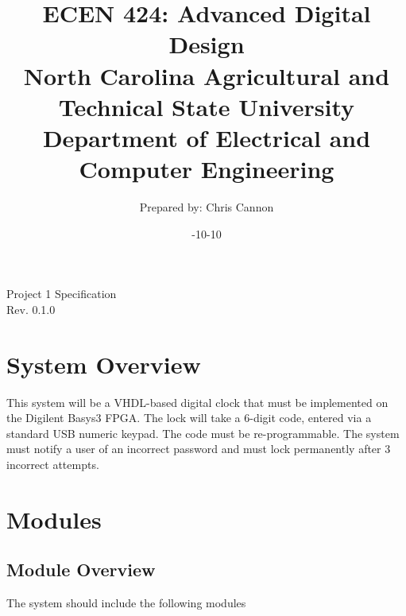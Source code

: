 \documentclass[11pt]{article}
\title {{\titleFont ECEN 424: Advanced Digital Design\\ North Carolina Agricultural and Technical State University \\ Department of Electrical and Computer Engineering}} %
\author{\titleFont Prepared by: Chris Cannon} %
\date{\titleFont 2018-10-10}
\begin{document}
\begin{titlingpage}
\maketitle
\begin{center}
	Project 1 Specification \\ Rev. 0.1.0
\end{center}
\end{titlingpage}

\section{System Overview}
This system will be a VHDL-based digital clock that must be implemented on the Digilent Basys3 FPGA. The lock will take a 6-digit code, entered via a standard USB numeric keypad. The code must be re-programmable. The system must notify a user of an incorrect password and must lock permanently after 3 incorrect attempts.

\section{Modules}

\subsection{Module Overview}

The system should include the following modules
\end{document}
